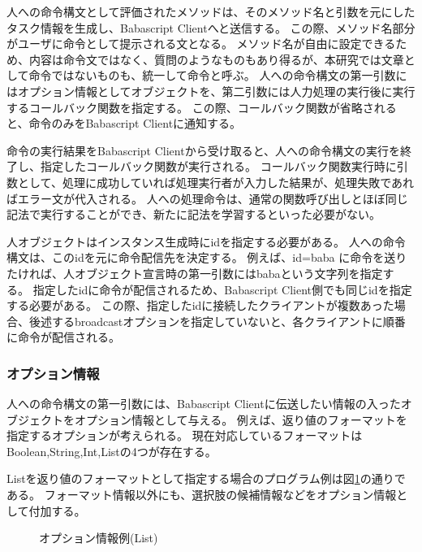 \documentclass[twoside]{wiss}
\begin{document}
人への命令構文として評価されたメソッドは、そのメソッド名と引数を元にしたタスク情報を生成し、Babascript Clientへと送信する。
この際、メソッド名部分がユーザに命令として提示される文となる。
メソッド名が自由に設定できるため、内容は命令文ではなく、質問のようなものもあり得るが、本研究では文章として命令ではないものも、統一して命令と呼ぶ。
人への命令構文の第一引数にはオプション情報としてオブジェクトを、第二引数には人力処理の実行後に実行するコールバック関数を指定する。
この際、コールバック関数が省略されると、命令のみをBabascript Clientに通知する。

命令の実行結果をBabascript Clientから受け取ると、人への命令構文の実行を終了し、指定したコールバック関数が実行される。
コールバック関数実行時に引数として、処理に成功していれば処理実行者が入力した結果が、処理失敗であればエラー文が代入される。
人への処理命令は、通常の関数呼び出しとほぼ同じ記法で実行することができ、新たに記法を学習するといった必要がない。

人オブジェクトはインスタンス生成時にidを指定する必要がある。
人への命令構文は、このidを元に命令配信先を決定する。
例えば、id=baba に命令を送りたければ、人オブジェクト宣言時の第一引数にはbabaという文字列を指定する。
指定したidに命令が配信されるため、Babascript Client側でも同じidを指定する必要がある。
この際、指定したidに接続したクライアントが複数あった場合、後述するbroadcastオプションを指定していないと、各クライアントに順番に命令が配信される。
  
\subsubsection{オプション情報}
人への命令構文の第一引数には、Babascript Clientに伝送したい情報の入ったオブジェクトをオプション情報として与える。
例えば、返り値のフォーマットを指定するオプションが考えられる。
現在対応しているフォーマットはBoolean,String,Int,Listの4つが存在する。

Listを返り値のフォーマットとして指定する場合のプログラム例は図\ref{script_02}の通りである。
フォーマット情報以外にも、選択肢の候補情報などをオプション情報として付加する。

\begin{figure}[!h]  
  \centering
  \caption{オプション情報例(List)}
  \label{script_02}
\end{figure}
\end{document}
